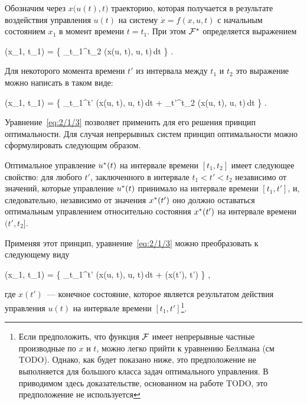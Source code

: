 Обозначим через $x \bigl( u(t), t \bigr)$ траекторию, которая получается в результате воздействия управления $u(t)$ на систему $\dot{x} = f(x, u, t)$ с начальным состоянием $x_1$ в момент времени $t = t_1$. При этом $\mathcal{F}^{*}$ определяется выражением

    \optF(x_1, t_1) =  \biggl\{ \int\limits_{t_1}^{t_2} \funcL\bigl(x(u, t), u, t\bigr)\,dt \biggr\} \mbox{.}
\eeq

Для некоторого момента времени $t'$ из интервала между $t_1$ и $t_2$ это выражение можно написать в таком виде:

    \optF(x_1, t_1) =  \biggl\{ \int\limits_{t_1}^{t'} \funcL\bigl(x(u, t), u, t\bigr)\,dt + \int\limits_{t'}^{t_2} \funcL\bigl(x(u, t), u, t\bigr)\,dt \biggr\} \mbox{.}
\eeq

Уравнение~\ref{eq:2/1/3} позволяет применить для его решения принцип оптимальности. Для случая непрерывных систем принцип оптимальности можно сформулировать следующим образом.

\begin{statement}
	Оптимальное управление $u^{*}(t)$ на интервале времени $[t_1, t_2]$ имеет следующее свойство: для любого $t'$, заключенного в интервале $t_1 < t' < t_2$ независимо от значений, которые управление $u^{*}(t)$ принимало на интервале времени $[t_1, t']$, и, следовательно, независимо от значения $x^{*}(t')$ оно должно оставаться оптимальным управлением относительно состояния $x^{*}(t')$ на интервале времени $(t', t_2]$.
\end{statement}

Применяя этот принцип, уравнение~\ref{eq:2/1/3} можно преобразовать к следующему виду

    \optF(x_1, t_1) =  \biggl\{ \int\limits_{t_1}^{t'} \funcL\bigl(x(u, t), u, t\bigr)\,dt + \optF\bigl(x(t'), t'\bigr) \biggr\} \mbox{,}
\eeq

где $x(t')$~--- конечное состояние, которое является результатом действия управления $u(t)$ на интервале времени $[t_1, t']$\footnote{ Если предположить, что функция $\mathcal{F}$ имеет непрерывные частные производные по $x$ и $t$, можно легко прийти к уравнению Беллмана (см TODO). Однако, как будет показано ниже, это предположение не выполняется для большого класса задач оптимального управления. В приводимом здесь доказательстве, основанном на работе TODO, это предположение не используется }.


